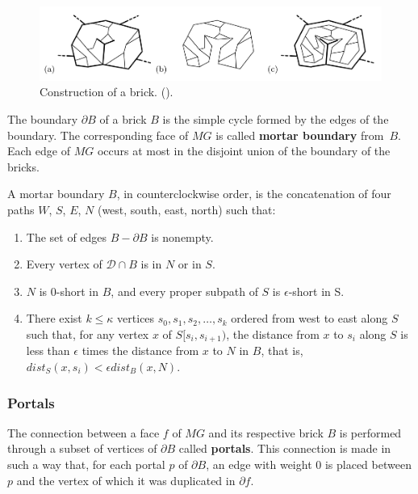 \begin{figure}[h]
    \centering
    \includegraphics[scale=0.45]{imgs/mortar4.png}
    \caption{Construction of a brick. (\cite{Borradaile2009b}).}
    \label{fig:mortar4}
\end{figure}

The boundary \(\partial B\) of a brick \(B\) is the simple cycle formed by the edges of the boundary. The corresponding face of \(MG\) is called \textbf{mortar boundary} from~\(B\). Each edge of \(MG\) occurs at most in the disjoint union of the boundary of the bricks.

\begin{flemma}
    A mortar boundary \(B\), in counterclockwise order, is the concatenation of four paths \(W\), \(S\), \(E\), \(N\) (west, south, east, north) such that:
    \begin{enumerate}
        \item The set of edges \(B - \partial B\) is nonempty.
        \item Every vertex of \(\mathcal{D} \cap B\) is in \(N\) or in \(S\).
        \item \(N\) is \(0\)-short in \(B\), and every proper subpath of \(S\) is \(\epsilon\)-short in S.
        \item There exist \(k \leq \kappa\) vertices \(s_0, s_1, s_2, \dots, s_k\) ordered from west to east along \(S\) such that, for any vertex \(x\) of \(S[s_i, s_{i+1})\), the distance from \(x\) to \(s_i\) along \(S\) is less than \(\epsilon\) times the distance from \(x\) to \(N\) in \(B\), that is, \(dist_S(x, s_i) < \epsilon dist_B(x, N)\).
    \end{enumerate}
\end{flemma}

\subsubsection{Portals}

The connection between a face \(f\) of \(MG\) and its respective brick \(B\) is performed through a subset of vertices of \(\partial B\) called \textbf{portals}. This connection is made in such a way that, for each portal \(p\) of \(\partial B\), an edge with weight 0 is placed between \(p\) and the vertex of which it was duplicated in \(\partial f\).

